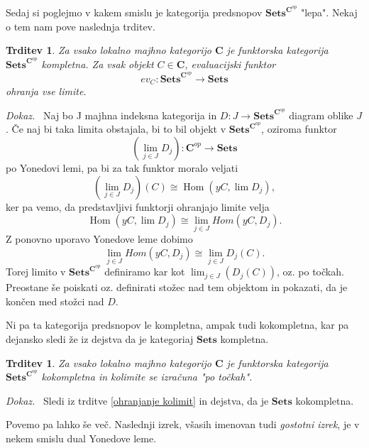\documentclass[12pt,a4paper]{book}
\theoremstyle{definition}
\theoremstyle{plain}
\newtheorem{trditev}[definicija]{Trditev}
\newenvironment{dokaz}{\emph{Dokaz.}\ }{\hspace{\fill}{$\Box$}}
\theoremstyle{definition}
\theoremstyle{remark}
\newcommand{\cat}[1]{\textbf{#1}}
\DeclareMathOperator{\Hom}{Hom}
\newcommand{\predsnop}[1]{\cat{Sets}^{\cat{#1}^{op}}}
\begin{document}
Sedaj si poglejmo v kakem smislu je kategorija predsnopov $\predsnop{C}$ "lepa". Nekaj o tem nam pove naslednja trditev.

\begin{trditev} \label{trditev 3.3}
Za vsako lokalno majhno kategorijo $\cat{C}$ je funktorska kategorija $\predsnop{C}$ kompletna. Za vsak objekt $C \in \cat{C}$, evaluacijski funktor 
$$ev_C : \predsnop{C} \to \cat{Sets}$$
ohranja vse limite.
\end{trditev}
\begin{dokaz}
Naj bo J majhna indeksna kategorija in $D : J \to \cat{Sets}^{\cat{C}^{op}}$ diagram oblike $J$. Če naj bi taka limita obstajala, bi to bil objekt v $\cat{Sets}^{\cat{C}^{op}}$, oziroma funktor 
$$(\lim_{j \in J} D_j): \cat{C}^{op} \to \cat{Sets}$$
po Yonedovi lemi, pa bi za tak funktor moralo veljati
$$(\lim_{j \in J} D_j)(C) \cong \Hom(yC, \lim D_j),$$
ker pa vemo, da predstavljivi funktorji ohranjajo limite velja
$$\Hom(yC, \lim D_j) \cong \lim_{j \in J} Hom(yC, D_j).$$
Z ponovno uporavo Yonedove leme dobimo
$$\lim_{j \in J} Hom(yC, D_j) \cong \lim_{j \in J} D_j(C).$$
Torej limito v $\predsnop{C}$ definiramo kar kot $\lim_{j \in J} (D_j(C))$, oz. po točkah.
Preostane še poiskati oz. definirati stožec nad tem objektom in pokazati, da je končen med stožci nad $D$.



\end{dokaz}

Ni pa ta kategorija predsnopov le kompletna, ampak tudi kokompletna, kar pa dejansko sledi že iz dejstva da je kategoriaj $\cat{Sets}$ kompletna.

\begin{trditev}
Za vsako lokalno majhno kategorijo $\cat{C}$ je funktorska kategorija $\predsnop{C}$ kokompletna in kolimite se izračuna "po točkah".
\end{trditev}
\begin{dokaz}
Sledi iz trditve \ref{ohranjanje kolimit} in dejstva, da je $\cat{Sets}$ kokompletna.
\end{dokaz}

Povemo pa lahko še več. Naslednji izrek, všasih imenovan tudi \emph{gostotni izrek}, je v nekem smislu dual Yonedove leme.
\end{document}
